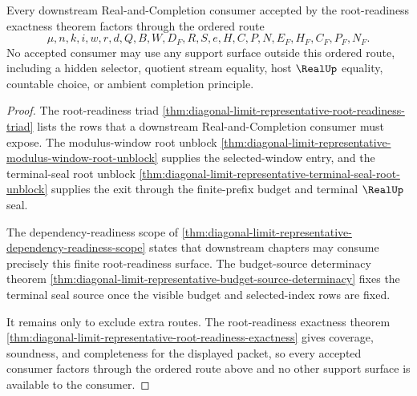 \begin{theorem}
\label{thm:diagonal-limit-representative-consumer-route-exhaustion}
Every downstream Real-and-Completion consumer accepted by the root-readiness exactness theorem factors through the ordered route
$$
\mu,n,k,i,w,r,d,Q,B,W,D_F,R,S,e,H,C,P,N,E_F,H_F,C_F,P_F,N_F.
$$
No accepted consumer may use any support surface outside this ordered route, including a hidden selector, quotient stream equality, host $\RealUp$ equality, countable choice, or ambient completion principle.
\end{theorem}
\begin{proof}
The root-readiness triad \autoref{thm:diagonal-limit-representative-root-readiness-triad} lists the rows that a downstream Real-and-Completion consumer must expose. The modulus-window root unblock \autoref{thm:diagonal-limit-representative-modulus-window-root-unblock} supplies the selected-window entry, and the terminal-seal root unblock \autoref{thm:diagonal-limit-representative-terminal-seal-root-unblock} supplies the exit through the finite-prefix budget and terminal $\RealUp$ seal.

The dependency-readiness scope of \autoref{thm:diagonal-limit-representative-dependency-readiness-scope} states that downstream chapters may consume precisely this finite root-readiness surface. The budget-source determinacy theorem \autoref{thm:diagonal-limit-representative-budget-source-determinacy} fixes the terminal seal source once the visible budget and selected-index rows are fixed.

It remains only to exclude extra routes. The root-readiness exactness theorem \autoref{thm:diagonal-limit-representative-root-readiness-exactness} gives coverage, soundness, and completeness for the displayed packet, so every accepted consumer factors through the ordered route above and no other support surface is available to the consumer.
\end{proof}
